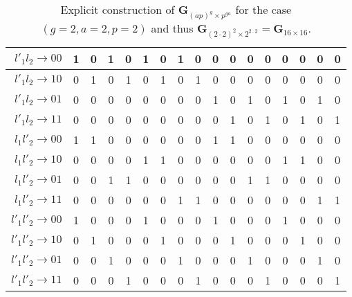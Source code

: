 \begin{table}
\begin{tabular}{ r || c | c | c | c | c | c | c | c | c | c | c | c | c | c | c | c }
    $l'_1 l_2 \rightarrow 00$ & 1 & 0 & 1 & 0 & 1 & 0 & 1 & 0 & 0 & 0 & 0 & 0 & 0 & 0 & 0 & 0\\ \hline
    $l'_1 l_2 \rightarrow 10$ & 0 & 1 & 0 & 1 & 0 & 1 & 0 & 1 & 0 & 0 & 0 & 0 & 0 & 0 & 0 & 0\\ \hline
    $l'_1 l_2 \rightarrow 01$ & 0 & 0 & 0 & 0 & 0 & 0 & 0 & 0 & 1 & 0 & 1 & 0 & 1 & 0 & 1 & 0\\ \hline
    $l'_1 l_2 \rightarrow 11$ & 0 & 0 & 0 & 0 & 0 & 0 & 0 & 0 & 0 & 1 & 0 & 1 & 0 & 1 & 0 & 1\\ \hline
            
    $l_1 l'_2 \rightarrow 00$ & 1 & 1 & 0 & 0 & 0 & 0 & 0 & 0 & 1 & 1 & 0 & 0 & 0 & 0 & 0 & 0\\ \hline
    $l_1 l'_2 \rightarrow 10$ & 0 & 0 & 0 & 0 & 1 & 1 & 0 & 0 & 0 & 0 & 0 & 0 & 1 & 1 & 0 & 0\\ \hline
    $l_1 l'_2 \rightarrow 01$ & 0 & 0 & 1 & 1 & 0 & 0 & 0 & 0 & 0 & 0 & 1 & 1 & 0 & 0 & 0 & 0\\ \hline
    $l_1 l'_2 \rightarrow 11$ & 0 & 0 & 0 & 0 & 0 & 0 & 1 & 1 & 0 & 0 & 0 & 0 & 0 & 0 & 1 & 1\\ \hline
    
    $l'_1 l'_2 \rightarrow 00$ & 1 & 0 & 0 & 0 & 1 & 0 & 0 & 0 & 1 & 0 & 0 & 0 & 1 & 0 & 0 & 0\\ \hline
    $l'_1 l'_2 \rightarrow 10$ & 0 & 1 & 0 & 0 & 0 & 1 & 0 & 0 & 0 & 1 & 0 & 0 & 0 & 1 & 0 & 0\\ \hline
    $l'_1 l'_2 \rightarrow 01$ & 0 & 0 & 1 & 0 & 0 & 0 & 1 & 0 & 0 & 0 & 1 & 0 & 0 & 0 & 1 & 0\\ \hline
    $l'_1 l'_2 \rightarrow 11$ & 0 & 0 & 0 & 1 & 0 & 0 & 0 & 1 & 0 & 0 & 0 & 1 & 0 & 0 & 0 & 1\\
    \end{tabular}
\caption{Explicit construction of $\mathbf{G}_{(ap)^g \times p^{ga}}$ for the case $(g=2,a=2,p=2)$ and thus $\mathbf{G}_{(2 \cdot 2)^2 \times 2^{2 \cdot 2}} = \mathbf{G}_{16 \times 16}$.}
\label{tab:logmat222}
\end{table}
